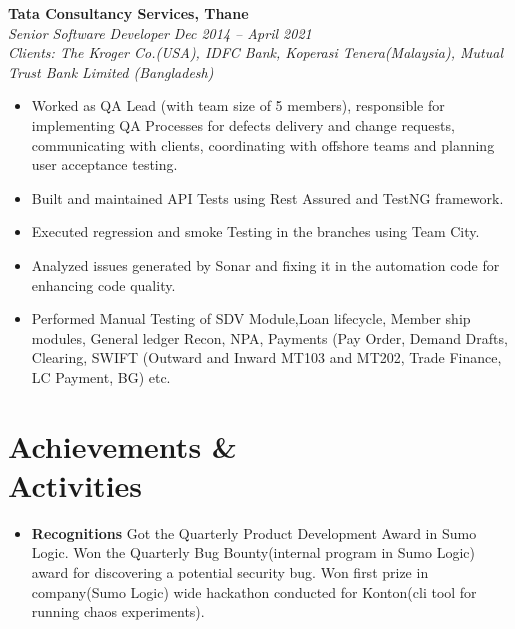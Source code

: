 \documentclass[margin,line]{resume}
\begin{document}
\begin{resume}
    \textbf{Tata Consultancy Services, Thane}\\
           \textsl{Senior Software Developer} \hfill \textsl{Dec 2014 -- April 2021} \vspace{0mm}\\\vspace{0mm}%
           \textsl{Clients: The Kroger Co.(USA), IDFC Bank, Koperasi Tenera(Malaysia), Mutual Trust Bank Limited (Bangladesh)} \hfill  \vspace{0mm}\\\vspace{0mm}%
    \begin{itemize}
            \item Worked as QA Lead (with team size of 5 members), responsible for implementing QA Processes for defects delivery  and change requests, communicating with clients, coordinating with offshore teams and planning user acceptance testing.
            \item Built and maintained API Tests using Rest Assured and TestNG framework.
            \item Executed regression and smoke Testing in the branches
using Team City.
            \item Analyzed issues generated by Sonar and fixing it in the automation code for enhancing code quality.
            \item Performed Manual Testing of SDV Module,Loan lifecycle, Member ship modules, General ledger Recon, NPA, Payments (Pay Order, Demand Drafts, Clearing, SWIFT (Outward and Inward MT103 and MT202, Trade Finance, LC Payment, BG) etc.
       \end{itemize}
    
\section{\mysidestyle Achievements \& \\ Activities}
\vspace{0mm}
    \begin{itemize}
            \item \textbf{Recognitions} \vspace{0mm}
                \subitem Got the Quarterly Product Development Award in Sumo Logic.
                \subitem Won the Quarterly Bug Bounty(internal program in Sumo Logic) award for discovering a potential security bug.
                \subitem Won first prize in company(Sumo Logic) wide hackathon conducted for Konton(cli tool for running chaos experiments).            
    \end{itemize}


\end{resume}
\end{document}
